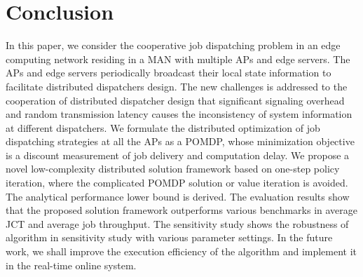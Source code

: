 \section{Conclusion}
\label{sec:conclusion}
In this paper, we consider the cooperative job dispatching problem in an edge computing network residing in a MAN with multiple APs and edge servers.
The APs and edge servers periodically broadcast their local state information to facilitate distributed dispatchers design.
The new challenges is addressed to the cooperation of distributed dispatcher design that significant signaling overhead and random transmission latency causes the inconsistency of system information at different dispatchers.
We formulate the distributed optimization of job dispatching strategies at all the APs as a POMDP, whose minimization objective is a discount measurement of job delivery and computation delay.
We propose a novel low-complexity distributed solution framework based on one-step policy iteration, where the complicated POMDP solution or value iteration is avoided.
The analytical performance lower bound is derived.
The evaluation results show that the proposed solution framework outperforms various benchmarks in average JCT and average job throughput.
The sensitivity study shows the robustness of algorithm in sensitivity study with various parameter settings.
In the future work, we shall improve the execution efficiency of the algorithm and implement it in the real-time online system. 